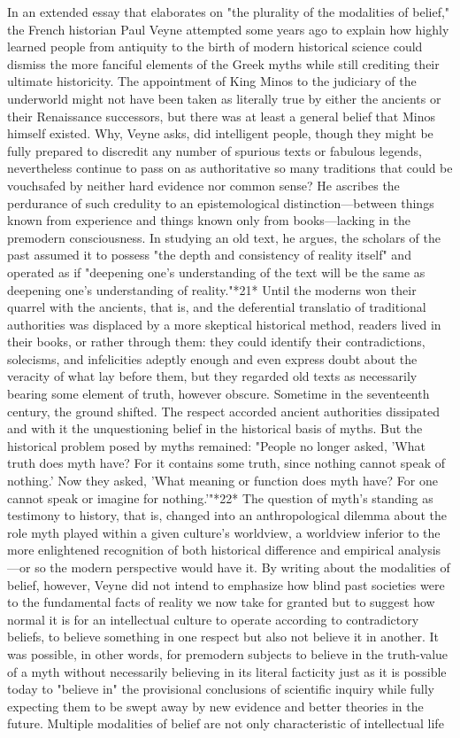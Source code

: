 	In an extended essay that elaborates on "the plurality of the modalities of belief," the French historian Paul Veyne attempted some years ago to explain how highly learned people from antiquity to the birth of modern historical science could dismiss the more fanciful elements of the Greek myths while still crediting their ultimate historicity. The appointment of King Minos to the judiciary of the underworld might not have been taken as literally true by either the ancients or their Renaissance successors, but there was at least a general belief that Minos himself existed. Why, Veyne asks, did intelligent people, though they might be fully prepared to discredit any number of spurious texts or fabulous legends, nevertheless continue to pass on as authoritative so many traditions that could be vouchsafed by neither hard evidence nor common sense? He ascribes the perdurance of such credulity to an epistemological distinction—between things known from experience and things known only from books—lacking in the premodern consciousness. In studying an old text, he argues, the scholars of the past assumed it to possess "the depth and consistency of reality itself" and operated as if "deepening one's understanding of the text will be the same as deepening one's understanding of reality."*21* Until the moderns won their quarrel with the ancients, that is, and the deferential translatio of traditional authorities was displaced by a more skeptical historical method, readers lived in their books, or rather through them: they could identify their contradictions, solecisms, and infelicities adeptly enough and even express doubt about the veracity of what lay before them, but they regarded old texts as necessarily bearing some element of truth, however obscure. Sometime in the seventeenth century, the ground shifted. The respect accorded ancient authorities dissipated and with it the unquestioning belief in the historical basis of myths. But the historical problem posed by myths remained: "People no longer asked, 'What truth does myth have? For it contains some truth, since nothing cannot speak of nothing.' Now they asked, 'What meaning or function does myth have? For one cannot speak or imagine for nothing.'"*22* The question of myth's standing as testimony to history, that is, changed into an anthropological dilemma about the role myth played within a given culture's worldview, a worldview inferior to the more enlightened recognition of both historical difference and empirical analysis—or so the modern perspective would have it. By writing about the modalities of belief, however, Veyne did not intend to emphasize how blind past societies were to the fundamental facts of reality we now take for granted but to suggest how normal it is for an intellectual culture to operate according to contradictory beliefs, to believe something in one respect but also not believe it in another. It was possible, in other words, for premodern subjects to believe in the truth-value of a myth without necessarily believing in its literal facticity just as it is possible today to "believe in" the provisional conclusions of scientific inquiry while fully expecting them to be swept away by new evidence and better theories in the future. Multiple modalities of belief are not only characteristic of intellectual life 